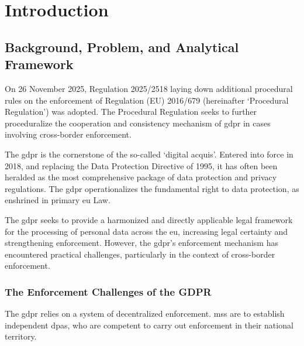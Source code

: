 \section{Introduction}
\label{sec:ch1-intro}

\subsection{Background, Problem, and Analytical Framework}
\label{sec:ch1-background}

On 26 November 2025, Regulation 2025/2518 laying down additional procedural rules on the enforcement of Regulation (EU) 2016/679\autocite{ProceduralRegulation} (hereinafter `Procedural Regulation') was adopted. 
The Procedural Regulation seeks to further proceduralize the cooperation and consistency mechanism of \gls{gdpr}\autocite{GDPR} in cases involving cross-border enforcement.

The \gls{gdpr} is the cornerstone of the  so-called `digital acquis'.\autocite[223]{zanfirGDPREDPS} 
Entered into force in 2018, and replacing the Data Protection Directive of 1995, it has often been heralded as the most comprehensive package of data protection and privacy regulations.\autocite[498]{mustertProceduralisingEnforcement2026} 
The \gls{gdpr} operationalizes the fundamental right to data protection, as enshrined in primary \gls{eu} Law.\autocites[8]{CFR}[16]{TFEU}

The \gls{gdpr} seeks to provide a harmonized and directly applicable legal framework for the processing of personal data across the \gls{eu}, increasing legal certainty and strengthening enforcement.\autocite[recital 7]{GDPR}
However, the \gls{gdpr}'s enforcement mechanism has encountered practical challenges, particularly in the context of cross-border enforcement.

\subsubsection{The Enforcement Challenges of the GDPR}
\label{sec:ch1-enforcement-challenges}

The \gls{gdpr} relies on a system of decentralized enforcement.\autocite[recital 1]{ProceduralRegulation} 
\glspl{ms} are to establish independent \glspl{dpa}, who are competent to carry out enforcement in their national territory.\autocite[51(1) and (2)]{GDPR}

